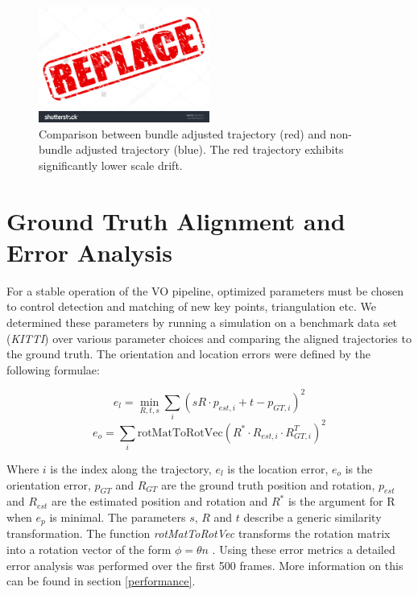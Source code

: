 \begin{figure}[htp]
  \centering
    \includegraphics[width=0.5\textwidth]{figures/BAeffect}
  \caption{Comparison between bundle adjusted trajectory (red) and non-bundle adjusted trajectory (blue). The red trajectory exhibits significantly lower scale drift.}
  \label{fig:BAeffect}
\end{figure}

\section{Ground Truth Alignment and Error Analysis}
\label{simulation}

For a stable operation of the VO pipeline, optimized parameters must be chosen to control detection and matching of new key points, triangulation etc. 
We determined these parameters by running a simulation  on a benchmark data set (\emph{KITTI}) over various parameter choices and comparing the aligned  trajectories to the ground truth. The orientation and location errors were defined by the following formulae:

\begin{equation*}e_l = \underset{R,t,s}{\min} \sum_i (sR \cdot p_{est, i} + t - p_{GT, i})^2\end{equation*}
\begin{equation*}e_o = \sum_i \text{rotMatToRotVec}(R^* \cdot R_{est,i} \cdot R_{GT, i}^T)^2\end{equation*}

Where $i$ is the index along the trajectory, $e_l$ is the location error, $e_o$ is the orientation error, $p_{GT}$ and $R_{GT}$ are the ground truth position and rotation, $p_{est}$ and $R_{est}$ are the estimated position and rotation and $R^*$ is the argument for R when $e_p$ is minimal. The parameters $s$, $R$ and $t$ describe a generic similarity transformation. The function \emph{rotMatToRotVec} transforms the rotation matrix into a rotation vector of the form $\phi = \theta n$ .  
Using these error metrics a detailed error analysis was performed over the first 500 frames. 
More information on this can be found in section \ref{performance}.